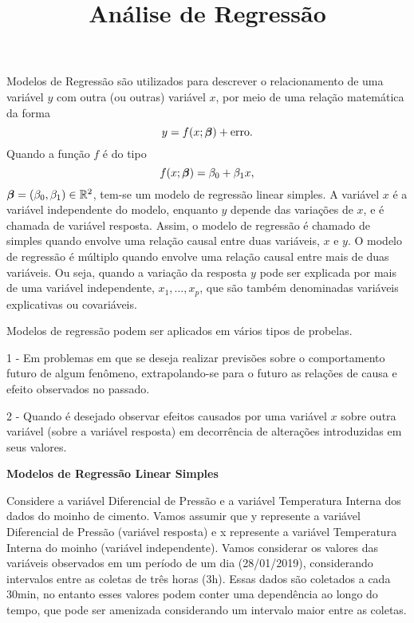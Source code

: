 \documentclass[]{article}
\title{Análise de Regressão}
\author{}
\date{\vspace{-2.5em}}
\begin{document}
\maketitle

\newcommand{\bfbeta}{\hbox{$\boldsymbol \beta$}}
\newcommand{\bfY}{\textbf{Y}}

Modelos de Regressão são utilizados para descrever o relacionamento de
uma variável \(y\) com outra (ou outras) variável \(x\), por meio de uma
relação matemática da forma
\[y = f(x;\hbox{$\boldsymbol \beta$}) + \textrm{erro}.\] Quando a função
\(f\) é do tipo
\[f(x;\hbox{$\boldsymbol \beta$}) = \beta_0 + \beta_1 x,\]
\(\hbox{$\boldsymbol \beta$}=(\beta_0,\beta_1) \in \mathbb{R}^2\),
tem-se um modelo de regressão linear simples. A variável \(x\) é a
variável independente do modelo, enquanto \(y\) depende das variações de
\(x\), e é chamada de variável resposta. Assim, o modelo de regressão é
chamado de simples quando envolve uma relação causal entre duas
variáveis, \(x\) e \(y\). O modelo de regressão é múltiplo quando
envolve uma relação causal entre mais de duas variáveis. Ou seja, quando
a variação da resposta \(y\) pode ser explicada por mais de uma variável
independente, \(x_1,...,x_p\), que são também denominadas variáveis
explicativas ou covariáveis.

Modelos de regressão podem ser aplicados em vários tipos de probelas.

1 - Em problemas em que se deseja realizar previsões sobre o
comportamento futuro de algum fenômeno, extrapolando-se para o futuro as
relações de causa e efeito observados no passado.

2 - Quando é desejado observar efeitos causados por uma variável \(x\)
sobre outra variável (sobre a variável resposta) em decorrência de
alterações introduzidas em seus valores.

\textbf{Modelos de Regressão Linear Simples}

Considere a variável Diferencial de Pressão e a variável Temperatura
Interna dos dados do moinho de cimento. Vamos assumir que y represente a
variável Diferencial de Pressão (variável resposta) e x represente a
variável Temperatura Interna do moinho (variável independente). Vamos
considerar os valores das variáveis observados em um período de um dia
(28/01/2019), considerando intervalos entre as coletas de três horas
(3h). Essas dados são coletados a cada 30min, no entanto esses valores
podem conter uma dependência ao longo do tempo, que pode ser amenizada
considerando um intervalo maior entre as coletas.
\end{document}
